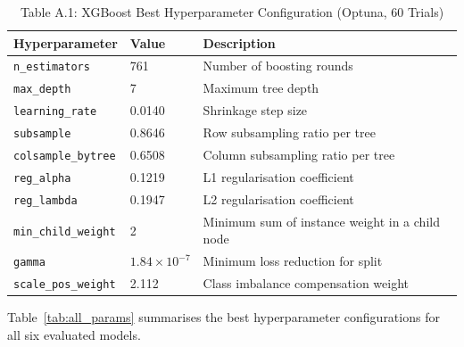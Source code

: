 \begin{table}[H]
\centering
\caption{Table A.1: XGBoost Best Hyperparameter Configuration (Optuna, 60 Trials)}
\label{tab:xgb_params}
\begin{tabular}{lll}
\toprule
\textbf{Hyperparameter} & \textbf{Value} & \textbf{Description} \\
\midrule
\texttt{n\_estimators}      & 761      & Number of boosting rounds \\
\texttt{max\_depth}         & 7        & Maximum tree depth \\
\texttt{learning\_rate}     & 0.0140   & Shrinkage step size \\
\texttt{subsample}          & 0.8646   & Row subsampling ratio per tree \\
\texttt{colsample\_bytree}  & 0.6508   & Column subsampling ratio per tree \\
\texttt{reg\_alpha}         & 0.1219   & L1 regularisation coefficient \\
\texttt{reg\_lambda}        & 0.1947   & L2 regularisation coefficient \\
\texttt{min\_child\_weight} & 2        & Minimum sum of instance weight in a child node \\
\texttt{gamma}              & $1.84 \times 10^{-7}$ & Minimum loss reduction for split \\
\texttt{scale\_pos\_weight} & 2.112    & Class imbalance compensation weight \\
\bottomrule
\end{tabular}
\end{table}

Table~\ref{tab:all_params} summarises the best hyperparameter configurations for all six evaluated models.

